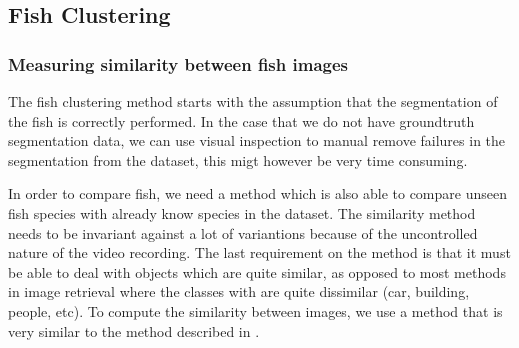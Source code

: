 \subsection{Fish Clustering}

\subsubsection{Measuring similarity between fish images}
The fish clustering method starts with the assumption that the segmentation of the 
fish is correctly performed. In the case that we do not have groundtruth segmentation data, we can 
use visual inspection to manual remove failures in the segmentation from the dataset, this migt however 
be very time consuming.

In order to compare fish, we need a method which is also able to compare unseen fish species with
already know species in the dataset.
The similarity method needs to be invariant against a lot of variantions because of the 
uncontrolled nature of the video recording. The last requirement on the method is that it
must be able to deal with objects which are quite similar, as opposed to most methods in image 
retrieval where the classes with are quite dissimilar (car, building, people, etc). 
To compute the similarity between images, we use a method that is very similar to the method described in 
\cite{goldberger_unsupervised_2006}.


